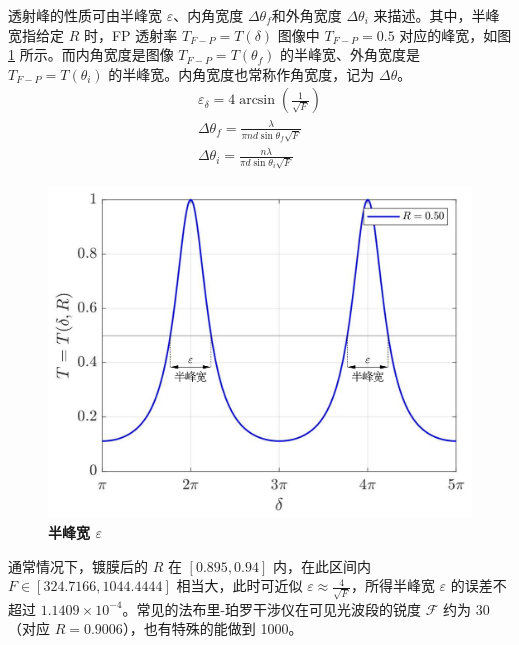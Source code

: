 \documentclass[UTF8]{report}
\theoremstyle{MyLineTheoremStyle} %
\theoremstyle{MyBlockTheoremStyle} %
\theoremstyle{MySubsubsectionStyle} %
\begin{document}
\begin{center}\noindent\begin{minipage}{0.48\columnwidth}
    \hspace*{2em} 透射峰的性质可由半峰宽 $\varepsilon$、内角宽度 $\Delta \theta_f$和外角宽度 $\Delta \theta_i$ 来描述。其中，半峰宽指给定 $R$ 时，FP 透射率 $T_{F-P} = T(\delta)$ 图像中 $T_{F-P} = 0.5$ 对应的峰宽，如图 \ref{半峰宽} 所示。而内角宽度是图像 $T_{F-P} = T(\theta_f)$ 的半峰宽、外角宽度是 $T_{F-P} = T(\theta_i)$ 的半峰宽。内角宽度也常称作角宽度，记为 $\Delta \theta$。
\begin{gather}
    \varepsilon_{\delta} = 4 \arcsin \left(\frac{1}{\sqrt{F} }\right) 
    \\
    \Delta \theta_f = \frac{\lambda}{\pi n d \sin \theta_f\sqrt{F}}
    \\
    \Delta \theta_i = \frac{n \lambda}{\pi d\sin \theta_i \sqrt{F}} 
\end{gather}
\end{minipage}\hfill\begin{minipage}{0.48\columnwidth}
    \begin{figure}[H]\centering
        \includegraphics[width=\columnwidth]{assets/3/半峰宽.pdf}
        \caption{\bfseries 半峰宽 $\varepsilon$}\label{半峰宽}
        \end{figure}
\end{minipage}\end{center}

通常情况下，镀膜后的 $R$ 在 $ [0.895, 0.94]$ 内，在此区间内 $F \in [324.7166, 1044.4444]$ 相当大，此时可近似 $\varepsilon \approx\frac{4}{\sqrt{F}}$，所得半峰宽 $\varepsilon$ 的误差不超过 $ 1.1409\times 10^{-4} $。常见的法布里-珀罗干涉仪在可见光波段的锐度 $\mathscr{F}$ 约为 30（对应 $R = 0.9006$），也有特殊的能做到 1000。
\end{document}
